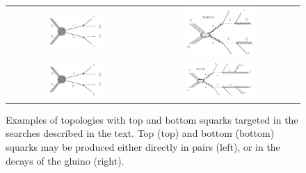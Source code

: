 \begin{figure}
\centering
\begin{tabular}{cc}
\includegraphics[width=0.45\textwidth]{HCPPlots/T2tt.pdf} &
\includegraphics[width=0.45\textwidth]{HCPPlots/A2.pdf} \\
\includegraphics[width=0.45\textwidth]{HCPPlots/T2bb.pdf} &
\includegraphics[width=0.45\textwidth]{HCPPlots/B2.pdf} \\
\end{tabular}
\caption{
Examples of topologies with top and bottom squarks targeted in the searches described in the text.
Top (top) and bottom (bottom) squarks may be produced either directly in pairs (left), or in the
decays of the gluino (right).
\label{fig:diagrams}
}
\end{figure}



